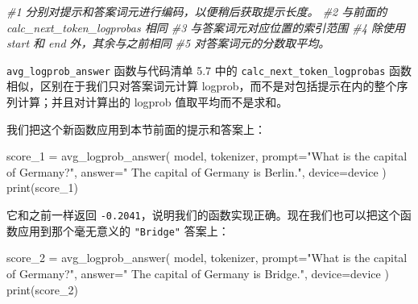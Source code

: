 {\noindent\small\textit{\#1 分别对提示和答案词元进行编码，以便稍后获取提示长度。 \newline \#2 与前面的 calc\_next\_token\_logprobas 相同 \newline \#3 与答案词元对应位置的索引范围 \newline \#4 除使用 start 和 end 外，其余与之前相同 \newline \#5 对答案词元的分数取平均。}\par}

\texttt{avg\_logprob\_answer} 函数与代码清单 5.7 中的 \texttt{calc\_next\_token\_logprobas} 函数相似，区别在于我们只对答案词元计算 logprob，而不是对包括提示在内的整个序列计算；并且对计算出的 logprob 值取平均而不是求和。

我们把这个新函数应用到本节前面的提示和答案上：

\begin{codebox}
score_1 = avg_logprob_answer(
    model, tokenizer,
    prompt="What is the capital of Germany?",
    answer=" The capital of Germany is Berlin.",
    device=device
)
print(score_1)
\end{codebox}

它和之前一样返回 \texttt{-0.2041}，说明我们的函数实现正确。现在我们也可以把这个函数应用到那个毫无意义的 \texttt{"}\texttt{Bridge}\texttt{"} 答案上：

\begin{codebox}
score_2 = avg_logprob_answer(
    model, tokenizer,
    prompt="What is the capital of Germany?",
    answer=" The capital of Germany is Bridge.",
    device=device
)
print(score_2)
\end{codebox}

